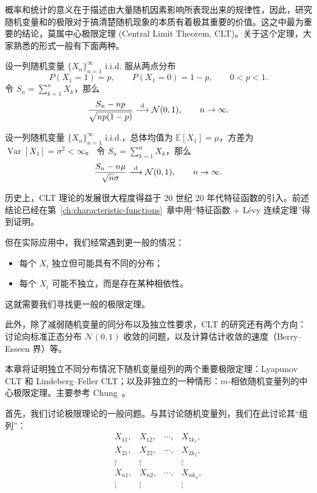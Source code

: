 概率和统计的意义在于描述由大量随机因素影响所表现出来的规律性，因此，研究随机变量和的极限对于搞清楚随机现象的本质有着极其重要的价值。这之中最为重要的结论，莫属中心极限定理 (Central Limit Theorem, CLT)。关于这个定理，大家熟悉的形式一般有下面两种。

\begin{theorem}
设一列随机变量 $\{X_n\}_{n=1}^\infty$ i.i.d. 服从两点分布
\[
P(X_1=1)=p,\qquad P(X_1=0)=1-p,\qquad 0<p<1.
\]
令 $S_n=\sum_{k=1}^nX_k$，那么
\[
\frac{S_n-np}{\sqrt{np(1-p)}}\overset{\rm d}\longrightarrow\mathcal N(0,1),
\qquad n\to\infty.
\]
\end{theorem}

\begin{theorem}
设一列随机变量 $\{X_n\}_{n=1}^\infty$ i.i.d.，总体均值为
$\mathbb E[X_1]=\mu$，方差为 $\operatorname{Var}[X_1]=\sigma^2<\infty$。
令 $S_n=\sum_{k=1}^nX_k$，那么
\[
\frac{S_n-n\mu}{\sqrt n\sigma}\overset{\rm d}\longrightarrow\mathcal N(0,1),
\qquad n\to\infty.
\]
\end{theorem}

历史上，CLT 理论的发展很大程度得益于 20 世纪 20 年代特征函数的引入。前述结论已经在第~\ref{ch:characteristic-functions}~章中用“特征函数 + L\'evy 连续定理”得到证明。

但在实际应用中，我们经常遇到更一般的情况：
\begin{itemize}
\item 每个 $X_i$ 独立但可能具有不同的分布；
\item 每个 $X_i$ 可能不独立，而是存在某种相依性。
\end{itemize}
这就需要我们寻找更一般的极限定理。

此外，除了减弱随机变量的同分布以及独立性要求，CLT 的研究还有两个方向：讨论向标准正态分布 $\mathcal N(0,1)$ 收敛的问题，以及计算估计收敛的速度（Berry--Esseen 界）等。

本章将证明独立不同分布情况下随机变量组列的两个重要极限定理：Lyapunov CLT 和 Lindeberg--Feller CLT；以及非独立的一种情形：$m$-相依随机变量列的中心极限定理。主要参考 Chung~\cite[第 7 章]{chung2001}。

首先，我们讨论极限理论的一般问题。与其讨论随机变量列，我们在此讨论其“组列”：
\[
\begin{array}{cccc}
X_{11},&X_{12},&\cdots,&X_{1k_1},\\
X_{21},&X_{22},&\cdots,&X_{2k_2},\\
\vdots&\vdots&&\vdots\\
X_{n1},&X_{n2},&\cdots,&X_{nk_n},\\
\vdots&\vdots&&\vdots
\end{array}
\]

